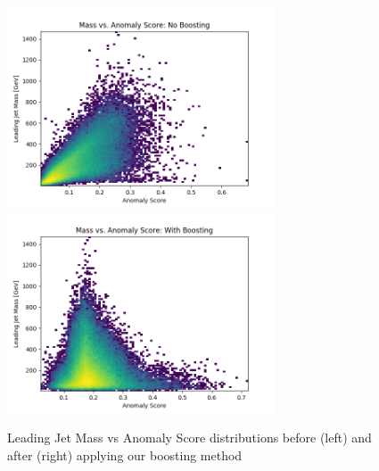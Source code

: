 \documentclass[12pt, a4paper]{article}
\begin{document}
\begin{figure}[H]
	\begin{center}
		\includegraphics[width=225pt]{imgs/ProcNoBoostPt_Background_July20_Background_July20_Weights_Leading_ConstOnly_Avg_M_vs_Score_ProcTest.png}
		\includegraphics[width=225pt]{imgs/ProcBoostPt_Background_July20_Background_July20_Weights_Leading_ConstOnly_Avg_M_vs_Score_ProcTest.png}
	\end{center}
	\caption{Leading Jet Mass vs Anomaly Score distributions before (left) and after (right) applying our boosting method}
	\label{fig:mass_vs_score_boost}
\end{figure}
\end{document}
